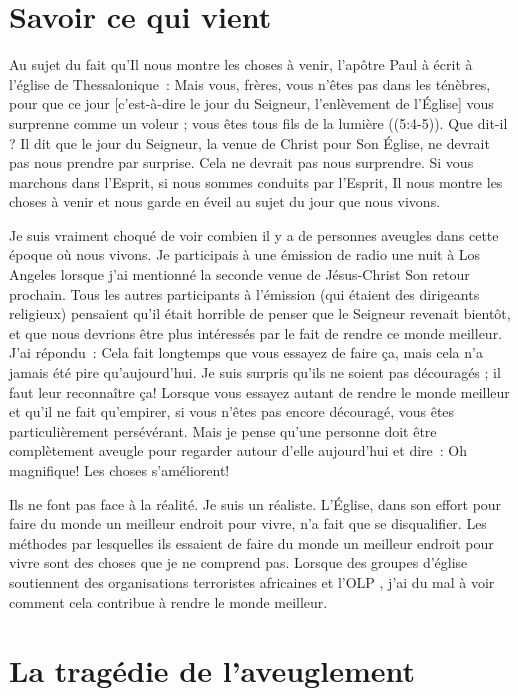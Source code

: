 \section*{Savoir ce qui vient}

Au sujet du fait qu'Il nous montre les choses à venir,
 l'apôtre Paul à écrit à l'église de Thessalonique~:
 \og Mais vous, frères, vous n'êtes pas dans les ténèbres,
 pour que ce jour [c'est-à-dire le jour du Seigneur,
 l'enlèvement de l'Église] vous surprenne comme un voleur ;
 vous êtes tous fils de la lumière \fg{}
 ((5:4-5)).
 Que dit-il ? Il dit que le jour du Seigneur, la venue de Christ
 pour Son Église, ne devrait pas nous prendre par surprise.
 Cela ne devrait pas nous surprendre. Si vous marchons dans l'Esprit,
 si nous sommes conduits par l'Esprit, Il nous montre les choses à venir
 et nous garde en éveil au sujet du jour que nous vivons.

Je suis vraiment choqué de voir combien il y a de personnes aveugles
 dans cette époque où nous vivons. Je participais à une émission de radio
 une nuit à Los Angeles lorsque j'ai mentionné la seconde venue
 de Jésus-Christ \ocadr Son retour prochain.
 Tous les autres participants à l'émission
 (qui étaient des dirigeants religieux) pensaient qu'il était horrible
 de penser que le Seigneur revenait bientôt, et que nous devrions être plus
 intéressés par le fait de rendre ce monde meilleur. J'ai répondu~:
 \og Cela fait longtemps que vous essayez de faire ça, mais cela n'a jamais
 été pire qu'aujourd'hui. \fg{}
 Je suis surpris qu'ils ne soient pas découragés ;
 il faut leur reconnaître ça!
 Lorsque vous essayez autant de rendre le monde meilleur et qu'il ne fait
 qu'empirer, si vous n'êtes pas encore découragé, vous êtes
 particulièrement persévérant.
 Mais je pense qu'une personne doit être complètement aveugle pour regarder
 autour d'elle aujourd'hui et dire~:
 \og Oh magnifique! Les choses s'améliorent! \fg{}

Ils ne font pas face à la réalité. Je suis un réaliste.
 L'Église, dans son effort pour faire du monde un meilleur endroit
 pour vivre, n'a fait que se disqualifier.
 Les méthodes par lesquelles ils essaient de faire du monde un meilleur
 endroit pour vivre sont des choses que je ne comprend pas. 
 Lorsque des groupes d'église soutiennent des organisations terroristes
 africaines et l'OLP ,
 j'ai du mal à voir comment cela contribue à rendre le monde meilleur.


\section*{La tragédie de l'aveuglement}

